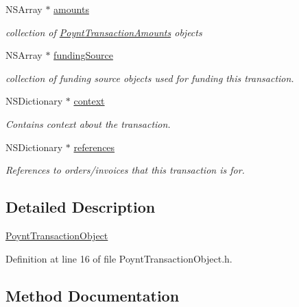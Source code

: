 \begin{DoxyCompactItemize}
N\+S\+Array $\ast$ \hyperlink{interface_poynt_transaction_object_a5ab449d070271ee2c9d138bb7b472a6c}{amounts}
\begin{DoxyCompactList}\small\item\em collection of \hyperlink{interface_poynt_transaction_amounts}{Poynt\+Transaction\+Amounts} objects \end{DoxyCompactList}\item 
N\+S\+Array $\ast$ \hyperlink{interface_poynt_transaction_object_ab4cac3360e86d21570d89915c99e6943}{funding\+Source}
\begin{DoxyCompactList}\small\item\em collection of funding source objects used for funding this transaction. \end{DoxyCompactList}\item 
N\+S\+Dictionary $\ast$ \hyperlink{interface_poynt_transaction_object_a97674af3143e04f09bbc6590dab812d7}{context}
\begin{DoxyCompactList}\small\item\em Contains context about the transaction. \end{DoxyCompactList}\item 
N\+S\+Dictionary $\ast$ \hyperlink{interface_poynt_transaction_object_a2bdc3d5a4da018a352f33b946a0ea384}{references}
\begin{DoxyCompactList}\small\item\em References to orders/invoices that this transaction is for. \end{DoxyCompactList}\end{DoxyCompactItemize}


\subsection{Detailed Description}
\hyperlink{interface_poynt_transaction_object}{Poynt\+Transaction\+Object} 

Definition at line 16 of file Poynt\+Transaction\+Object.\+h.



\subsection{Method Documentation}
\hypertarget{interface_poynt_transaction_object_a777cf6da1ae0fc9452b06142a5adaa14}{}\label{interface_poynt_transaction_object_a777cf6da1ae0fc9452b06142a5adaa14} 
